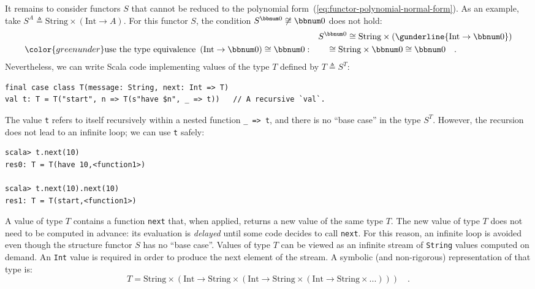 It remains to consider functors $S$ that cannot be reduced to the
polynomial form~(\ref{eq:functor-polynomial-normal-form}). As an
example, take $S^{A}\triangleq\text{String}\times(\text{Int}\rightarrow A)$.
For this functor $S$, the condition $S^{\bbnum 0}\not\cong\bbnum 0$
does not hold:
\begin{align*}
 & S^{\bbnum 0}\cong\text{String}\times(\gunderline{\text{Int}\rightarrow\bbnum 0})\\
{\color{greenunder}\text{use the type equivalence }\left(\text{Int}\rightarrow\bbnum 0\right)\cong\bbnum 0:}\quad & \quad\cong\text{String}\times\bbnum 0\cong\bbnum 0\quad.
\end{align*}
Nevertheless, we can write Scala code implementing values of the type
$T$ defined by $T\triangleq S^{T}$:
\begin{lstlisting}
final case class T(message: String, next: Int => T)
val t: T = T("start", n => T(s"have $n", _ => t))   // A recursive `val`.
\end{lstlisting}
The value \lstinline!t! refers to itself recursively within a nested
function \lstinline!_ => t!, and there is no \textsf{``}base case\textsf{''} in the
type $S^{T}$. However, the recursion does not lead to an infinite
loop; we can use \lstinline!t! safely:
\begin{lstlisting}
scala> t.next(10)
res0: T = T(have 10,<function1>)

scala> t.next(10).next(10)
res1: T = T(start,<function1>)
\end{lstlisting}
A value of type $T$ contains a function \lstinline!next! that, when
applied, returns a new value of the same type $T$. The new value
of type $T$ does not need to be computed in advance: its evaluation
is \emph{delayed} until some code decides to call \lstinline!next!.
For this reason, an infinite loop is avoided even though the structure
functor $S$ has no \textsf{``}base case\textsf{''}. Values of type $T$ can be viewed
as an infinite stream of \lstinline!String! values computed on demand.
An \lstinline!Int! value is required in order to produce the next
element of the stream. A symbolic (and non-rigorous) representation
of that type is:
\[
T=\text{String}\times(\text{Int}\rightarrow\text{String}\times(\text{Int}\rightarrow\text{String}\times(\text{Int}\rightarrow\text{String}\times...)))\quad.
\]

